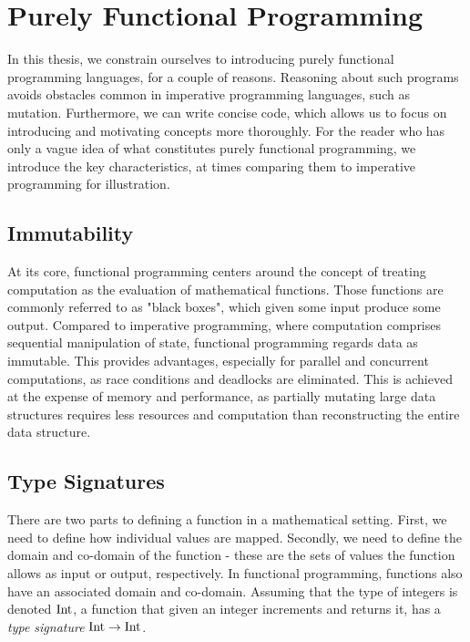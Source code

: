 \section{Purely Functional Programming}

In this thesis, we constrain ourselves to introducing purely functional programming languages, for a couple of reasons. Reasoning about such programs avoids obstacles common in imperative programming languages, such as mutation. Furthermore, we can write concise code, which allows us to focus on introducing and motivating concepts more thoroughly. For the reader who has only a vague idea of what constitutes purely functional programming, we introduce the key characteristics, at times comparing them to imperative programming for illustration.

\subsection{Immutability}

At its core, functional programming centers around the concept of treating computation as the evaluation of mathematical functions. Those functions are commonly referred to as "black boxes", which given some input produce some output. Compared to imperative programming, where computation comprises sequential manipulation of state, functional programming regards data as immutable. This provides advantages, especially for parallel and concurrent computations, as race conditions and deadlocks are eliminated. This is achieved at the expense of memory and performance, as partially mutating large data structures requires less resources and computation than reconstructing the entire data structure.

\subsection{Type Signatures}

There are two parts to defining a function in a mathematical setting. First, we need to define how individual values are mapped. Secondly, we need to define the domain and co-domain of the function - these are the sets of values the function allows as input or output, respectively. In functional programming, functions also have an associated domain and co-domain. Assuming that the type of integers is denoted \(\text{Int}\), a function that given an integer increments and returns it, has a \emph{type signature} \(\text{Int} \to \text{Int}\).  

